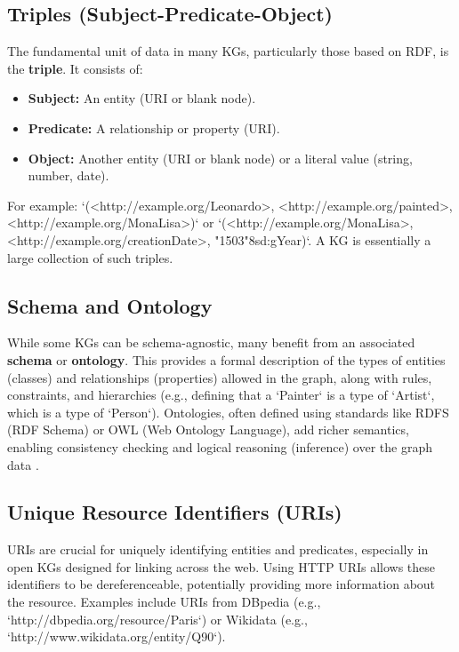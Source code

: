 \documentclass[11pt, a4paper]{article}
\begin{document}
\subsection{Triples (Subject-Predicate-Object)}
\label{subsec:triples}
The fundamental unit of data in many KGs, particularly those based on RDF, is the \textbf{triple}. It consists of:
\begin{itemize}
    \item \textbf{Subject:} An entity (URI or blank node).
    \item \textbf{Predicate:} A relationship or property (URI).
    \item \textbf{Object:} Another entity (URI or blank node) or a literal value (string, number, date).
\end{itemize}
For example: `(<http://example.org/Leonardo>, <http://example.org/painted>, <http://example.org/MonaLisa>)` or `(<http://example.org/MonaLisa>, <http://example.org/creationDate>, "1503"^^xsd:gYear)`. A KG is essentially a large collection of such triples.

\subsection{Schema and Ontology}
\label{subsec:schema_ontology}
While some KGs can be schema-agnostic, many benefit from an associated \textbf{schema} or \textbf{ontology}. This provides a formal description of the types of entities (classes) and relationships (properties) allowed in the graph, along with rules, constraints, and hierarchies (e.g., defining that a `Painter` is a type of `Artist`, which is a type of `Person`). Ontologies, often defined using standards like RDFS (RDF Schema) or OWL (Web Ontology Language), add richer semantics, enabling consistency checking and logical reasoning (inference) over the graph data \cite{OWL2Overview}.

\subsection{Unique Resource Identifiers (URIs)}
\label{subsec:uris}
URIs are crucial for uniquely identifying entities and predicates, especially in open KGs designed for linking across the web. Using HTTP URIs allows these identifiers to be dereferenceable, potentially providing more information about the resource. Examples include URIs from DBpedia (e.g., `http://dbpedia.org/resource/Paris`) or Wikidata (e.g., `http://www.wikidata.org/entity/Q90`).
\end{document}
